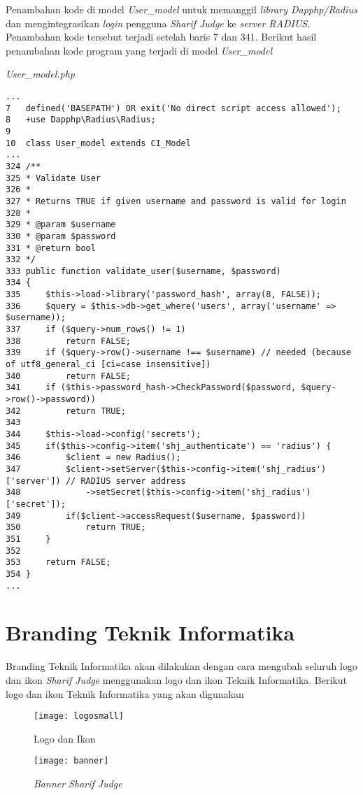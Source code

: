 Penambahan kode di model \textit{User\_model} untuk memanggil \textit{library Dapphp/Radius} dan mengintegrasikan \textit{login} pengguna \textit{Sharif Judge} ke \textit{server RADIUS}. Penambahan kode tersebut terjadi setelah baris 7 dan 341. Berikut hasil penambahan kode program yang terjadi di model \textit{User\_model}

\textit{User\_model.php}
\begin{lstlisting}[basicstyle=\ttfamily, frame=single,
columns=fullflexible, keepspaces=true, breaklines=true]
...
7	defined('BASEPATH') OR exit('No direct script access allowed');
8	+use Dapphp\Radius\Radius;
9
10	class User_model extends CI_Model
...
324	/**
325	* Validate User
326	*
327	* Returns TRUE if given username and password is valid for login
328	*
329	* @param $username
330	* @param $password
331	* @return bool
332	*/
333	public function validate_user($username, $password)
334	{
335		$this->load->library('password_hash', array(8, FALSE));
336		$query = $this->db->get_where('users', array('username' => $username));
337		if ($query->num_rows() != 1)
338			return FALSE;
339		if ($query->row()->username !== $username) // needed (because of utf8_general_ci [ci=case insensitive])
340			return FALSE;
341		if ($this->password_hash->CheckPassword($password, $query->row()->password))
342			return TRUE;
343
344		$this->load->config('secrets');
345		if($this->config->item('shj_authenticate') == 'radius') {
346			$client = new Radius();
347			$client->setServer($this->config->item('shj_radius')['server']) // RADIUS server address
348				->setSecret($this->config->item('shj_radius')['secret']);
349			if($client->accessRequest($username, $password))
350				return TRUE;
351		}
352		
353		return FALSE;
354	}
...
\end{lstlisting}

\section{Branding Teknik Informatika}
Branding Teknik Informatika akan dilakukan dengan cara mengubah seluruh logo dan ikon \textit{Sharif Judge} menggunakan logo dan ikon Teknik Informatika. Berikut logo dan ikon Teknik Informatika yang akan digunakan

\begin{figure}[H]
	\centering  
	\texttt{[image: logosmall]}  
	\caption[Logo dan Ikon]{Logo dan Ikon} 
	\label{fig:logosmall} 
\end{figure} 

\begin{figure}[H]
	\centering  
	\texttt{[image: banner]}  
	\caption[\textit{Banner Sharif Judge}]{\textit{Banner Sharif Judge}} 
	\label{fig:banner} 
\end{figure} 


